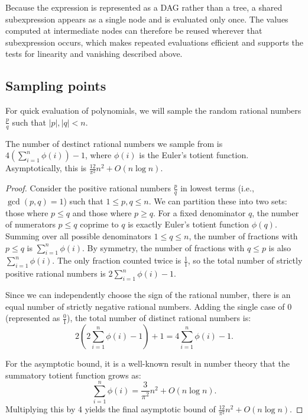 Because the expression is represented as a DAG rather than a tree, a shared subexpression appears as a single node and is evaluated only once. The values computed at intermediate nodes can therefore be reused wherever that subexpression occurs, which makes repeated evaluations efficient and supports the tests for linearity and vanishing described above.

\subsection*{Sampling points}
For quick evaluation of polynomials, we will sample the random rational numbers $\frac{p}{q}$ such that $|p|, |q| < n$.

\begin{lemma}
  The number of destinct rational numbers we sample from is $4(\sum_{i=1}^{n} \phi(i)) - 1$, where $\phi(i)$ is the Euler's totient function. Asymptotically, this is $\frac{12}{\pi^2} n^2 + O(n \log n)$.
\end{lemma}

\begin{proof}
  Consider the positive rational numbers $\frac{p}{q}$ in lowest terms (i.e., $\gcd(p, q) = 1$) such that $1 \le p, q \le n$. We can partition these into two sets: those where $p \le q$ and those where $p \ge q$.
  For a fixed denominator $q$, the number of numerators $p \le q$ coprime to $q$ is exactly Euler's totient function $\phi(q)$. Summing over all possible denominators $1 \le q \le n$, the number of fractions with $p \le q$ is $\sum_{i=1}^{n} \phi(i)$.
  By symmetry, the number of fractions with $q \le p$ is also $\sum_{i=1}^{n} \phi(i)$. The only fraction counted twice is $\frac{1}{1}$, so the total number of strictly positive rational numbers is $2\sum_{i=1}^{n} \phi(i) - 1$.

  Since we can independently choose the sign of the rational number, there is an equal number of strictly negative rational numbers. Adding the single case of $0$ (represented as $\frac{0}{1}$), the total number of distinct rational numbers is:
  \[
    2 \left( 2\sum_{i=1}^{n} \phi(i) - 1 \right) + 1 = 4\sum_{i=1}^{n} \phi(i) - 1.
  \]

  For the asymptotic bound, it is a well-known result in number theory \cite{hardy2008introduction} that the summatory totient function grows as:
  \[
    \sum_{i=1}^{n} \phi(i) = \frac{3}{\pi^2} n^2 + O(n \log n).
  \]
  Multiplying this by 4 yields the final asymptotic bound of $\frac{12}{\pi^2} n^2 + O(n \log n)$.
\end{proof}

